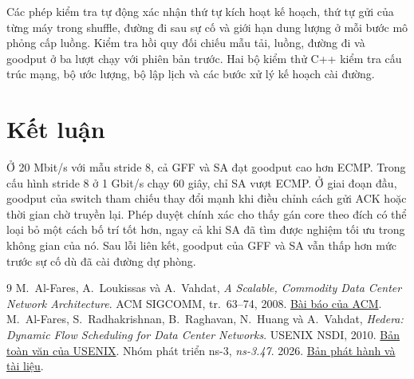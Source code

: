 \documentclass[conference,a4paper]{IEEEtran}
\begin{document}
Các phép kiểm tra tự động xác nhận thứ tự kích hoạt kế hoạch, thứ tự gửi của từng máy trong shuffle, đường đi sau sự cố và giới hạn dung lượng ở mỗi bước mô phỏng cấp luồng. Kiểm tra hồi quy đối chiếu mẫu tải, luồng, đường đi và goodput ở ba lượt chạy với phiên bản trước. Hai bộ kiểm thử C++ kiểm tra cấu trúc mạng, bộ ước lượng, bộ lập lịch và các bước xử lý kế hoạch cài đường.

\section{Kết luận}
Ở 20 Mbit/s với mẫu stride 8, cả GFF và SA đạt goodput cao hơn ECMP. Trong cấu hình stride 8 ở 1 Gbit/s chạy 60 giây, chỉ SA vượt ECMP. Ở giai đoạn đầu, goodput của switch tham chiếu thay đổi mạnh khi điều chỉnh cách gửi ACK hoặc thời gian chờ truyền lại. Phép duyệt chính xác cho thấy gán core theo đích có thể loại bỏ một cách bố trí tốt hơn, ngay cả khi SA đã tìm được nghiệm tối ưu trong không gian của nó. Sau lỗi liên kết, goodput của GFF và SA vẫn thấp hơn mức trước sự cố dù đã cài đường dự phòng.

\begin{thebibliography}{9}
M.~Al-Fares, A.~Loukissas và A.~Vahdat,
\emph{A Scalable, Commodity Data Center Network Architecture}.
ACM SIGCOMM, tr.~63--74, 2008.
\href{https://doi.org/10.1145/1402958.1402967}{Bài báo của ACM}.
M.~Al-Fares, S.~Radhakrishnan, B.~Raghavan, N.~Huang và A.~Vahdat,
\emph{Hedera: Dynamic Flow Scheduling for Data Center Networks}.
USENIX NSDI, 2010.
\href{https://www.usenix.org/legacy/event/nsdi10/tech/full_papers/al-fares.pdf}{Bản toàn văn của USENIX}.
Nhóm phát triển ns-3,
\emph{ns-3.47}.
2026.
\href{https://www.nsnam.org/releases/ns-3-47/}{Bản phát hành và tài liệu}.
\end{thebibliography}
\end{document}
